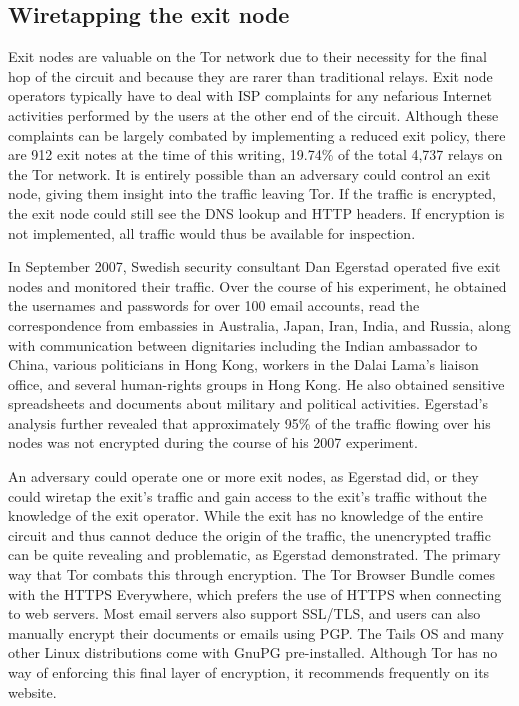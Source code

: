 \documentclass[journal]{IEEEtran}
\begin{document}
\subsection{Wiretapping the exit node}

Exit nodes are valuable on the Tor network due to their necessity for the final hop of the circuit and because they are rarer than traditional relays. Exit node operators typically have to deal with ISP complaints for any nefarious Internet activities performed by the users at the other end of the circuit. Although these complaints can be largely combated by implementing a reduced exit policy, there are 912 exit notes at the time of this writing, 19.74\% of the total 4,737 relays on the Tor network. It is entirely possible than an adversary could control an exit node, giving them insight into the traffic leaving Tor. If the traffic is encrypted, the exit node could still see the DNS lookup and HTTP headers. If encryption is not implemented, all traffic would thus be available for inspection.

In September 2007, Swedish security consultant Dan Egerstad operated five exit nodes and monitored their traffic. Over the course of his experiment, he obtained the usernames and passwords for over 100 email accounts, read the correspondence from embassies in Australia, Japan, Iran, India, and Russia, along with communication between dignitaries including the Indian ambassador to China, various politicians in Hong Kong, workers in the Dalai Lama's liaison office, and several human-rights groups in Hong Kong. He also obtained sensitive spreadsheets and documents about military and political activities. Egerstad's analysis further revealed that approximately 95\% of the traffic flowing over his nodes was not encrypted during the course of his 2007 experiment.\cite{Wired2007}

An adversary could operate one or more exit nodes, as Egerstad did, or they could wiretap the exit's traffic and gain access to the exit's traffic without the knowledge of the exit operator. While the exit has no knowledge of the entire circuit and thus cannot deduce the origin of the traffic, the unencrypted traffic can be quite revealing and problematic, as Egerstad demonstrated. The primary way that Tor combats this through encryption. The Tor Browser Bundle comes with the HTTPS Everywhere, which prefers the use of HTTPS when connecting to web servers. Most email servers also support SSL/TLS, and users can also manually encrypt their documents or emails using PGP. The Tails OS and many other Linux distributions come with GnuPG pre-installed. Although Tor has no way of enforcing this final layer of encryption, it recommends frequently on its website.
\end{document}
